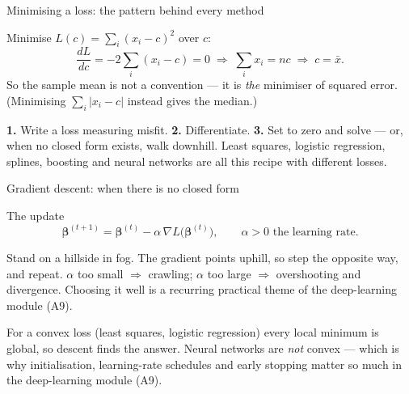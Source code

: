 \documentclass[aspectratio=169,11pt]{beamer}
\begin{document}
\begin{frame}{Minimising a loss: the pattern behind every method}
  \begin{numexample}
    Minimise $L(c) = \sum_i (x_i - c)^2$ over $c$:
    \[
      \frac{dL}{dc} = -2\sum_i (x_i - c) = 0
      \;\Longrightarrow\;
      \sum_i x_i = nc
      \;\Longrightarrow\;
      c = \bar x .
    \]
    So the sample mean is not a convention --- it is \emph{the} minimiser of
    squared error. (Minimising $\sum_i |x_i - c|$ instead gives the median.)
  \end{numexample}
  \begin{takeaway}
    \textbf{1.} Write a loss measuring misfit. \textbf{2.} Differentiate.
    \textbf{3.} Set to zero and solve --- or, when no closed form exists,
    walk downhill. Least squares, logistic regression, splines, boosting and
    neural networks are all this recipe with different losses.
  \end{takeaway}
\end{frame}

\begin{frame}{Gradient descent: when there is no closed form}
  \begin{block}{The update}
    \[
      \boldsymbol\beta^{(t+1)}
      = \boldsymbol\beta^{(t)} - \alpha\,\nabla L\bigl(\boldsymbol\beta^{(t)}\bigr),
      \qquad \alpha > 0 \text{ the learning rate}.
    \]
  \end{block}
  \begin{readme}
    Stand on a hillside in fog. The gradient points uphill, so step the
    opposite way, and repeat. $\alpha$ too small $\Rightarrow$ crawling;
    $\alpha$ too large $\Rightarrow$ overshooting and divergence. Choosing
    it well is a recurring practical theme of the deep-learning module (A9).
  \end{readme}
  \begin{takeaway}
    For a convex loss (least squares, logistic regression) every local
    minimum is global, so descent finds the answer. Neural networks are
    \emph{not} convex --- which is why initialisation, learning-rate
    schedules and early stopping matter so much in the deep-learning module (A9).
  \end{takeaway}
\end{frame}
\end{document}

